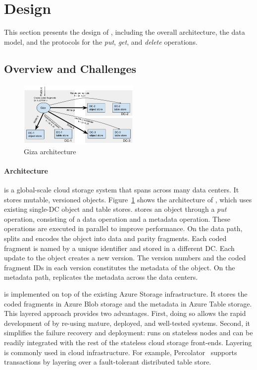 \section{Design}
\label{sec:design}

This section presents the design of {\name}, including the overall architecture,
the data model, and the protocols for the {\em put}, {\em get}, and {\em delete} operations.

\subsection{Overview and Challenges}

\begin{figure}[tp]
\centering
\includegraphics[width=0.52\textwidth]{fig/Giza}
\caption{Giza architecture\label{fig:arch}}
\end{figure}

\paragraph{Architecture}
{\name} is a global-scale cloud storage system that spans across many data
centers. It stores mutable, versioned objects. Figure~\ref{fig:arch} shows the
architecture of \name, which uses existing single-DC object and table stores.
\name stores an object through a {\em put} operation, consisting of a data operation and a metadata operation. These operations are executed in parallel to improve performance. On the data path, \name splits and
encodes the object into data and parity fragments.
Each coded fragment is named by a unique identifier and stored in a different DC.
Each update to the object creates a new version. The version
numbers and the coded fragment IDs in each version constitutes the
metadata of the object. On the metadata path, \name replicates the metadata
across the data centers.

\name is implemented on top of the existing Azure Storage infrastructure. It
stores the coded fragments in Azure Blob storage and the metadata in Azure Table
storage. This layered approach provides two advantages. First, doing so allows
the rapid development of \name by re-using mature, deployed, and well-tested
systems. Second, it simplifies the failure recovery and deployment: \name runs
on stateless nodes and can be readily integrated with the rest of the stateless
cloud storage front-ends. Layering is commonly used in cloud infrastructure. For
example, Percolator~\cite{peng12large} supports transactions by layering over a
fault-tolerant distributed table store.


